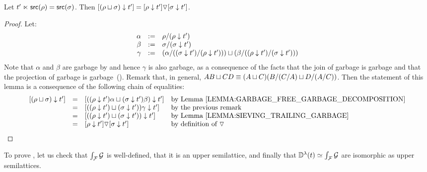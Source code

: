 \begin{lemma}
Let $t' \mathrel{\ltimes} \mathsf{src}(\rho) = \mathsf{src}(\sigma)$.
Then ${[(\rho \sqcup \sigma) \downarrow t']} = {[\rho \downarrow t']} \triangledown {[\sigma\downarrow t']}$.
\end{lemma}
\begin{proof}
Let:
\[
  \begin{array}{rcl}
    \alpha & := & \rho/(\rho \downarrow t') \\
    \beta  & := & \sigma/(\sigma \downarrow t') \\
    \gamma & := & (\alpha/((\sigma \downarrow t')/(\rho \downarrow t'))) \sqcup (\beta/((\rho \downarrow t')/(\sigma \downarrow t'))) \\
  \end{array}
\]
Note that $\alpha$ and $\beta$ are garbage by 
and hence $\gamma$ is also garbage, as a consequence of
the facts that the join of garbage is garbage
and that the projection of garbage is garbage~().
Remark that, in general, $AB \sqcup CD \equiv (A \sqcup C)(B/(C/A) \sqcup D/(A/C))$.
Then the statement of this lemma is a consequence of the following chain of equalities:
\[
  \begin{array}{rcll}
  \cls{(\redseq \sqcup \redseqtwo) \sieve \tm'}
  & = &
  \cls{((\redseq \sieve \tm')\alpha \sqcup (\redseqtwo \sieve \tm')\beta) \sieve \tm'}
  & \text{by \rlem{garbage_free_garbage_decomposition}}
  \\
  & = &
  \cls{((\redseq \sieve \tm') \sqcup (\redseqtwo \sieve \tm'))\gamma \sieve \tm'}
  & \text{by the previous remark}
  \\
  & = &
  \cls{((\redseq \sieve \tm') \sqcup (\redseqtwo \sieve \tm')) \sieve \tm'}
  & \text{by~\rlem{sieving_trailing_garbage}}
  \\
  & = & \cls{\redseq \sieve \tm'} \lorF \cls{\redseqtwo \sieve \tm'}
  & \text{by definition of $\lorF$}
  \end{array}
\]
\end{proof}

To prove ,
let us check that $\int_{\mathcal{F}}{\mathcal{G}}$ is well-defined,
that it is an upper semilattice,
and finally that $\mathbb{D}^{\lambda}(t) \simeq \int_{\mathcal{F}}{\mathcal{G}}$
are isomorphic as upper semilattices.

